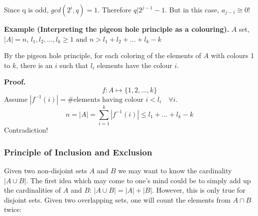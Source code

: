 Since q is odd, $gcd(2^i, q)=1$. Therefore $q | 2^{j-1} - 1$. But in this case, $a_{j-i}\cong 0$!


\textbf{Example (Interpreting the pigeon hole principle as a colouring).}
$A$ set, $|A| = n$,
$l_1, l_2, \ldots, l_k ≥ 1 \text{ and } n > l_1 + l_2 + \ldots + l_k - k$

By the pigeon hole principle, for each coloring of the elements of $A$ with colours 1 to $k$, there is an $i$ such that $l_i$ elements have the colour $i$.

\textbf{Proof.}
\[
  f: A\mapsto \{1,2,\ldots,k\}
\]
Assume
  $|f^{-1}(i)| = \text{\#elements having colour $i$} < l_i
  \quad\forall i$.
\[
  n = |A| = \sum_{i=1}^k |f^{-1}(i)| ≤ l_1 +\ldots + l_k - k
\]
Contradiction!


\subsubsection{Principle of Inclusion and Exclusion}

Given two non-disjoint sets $A$ and $B$  we may want to know the cardinality $|A \cup B|$.
The first idea which may come to one's mind could be to simply add up the cardinalities of $A$ and $B$:
$|A \cup B| = |A| + |B|$. However, this
is only true for disjoint sets. Given two overlapping sets, one will count the elements from
$A \cap B$ twice:


